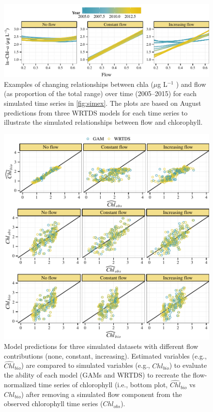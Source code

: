 \documentclass[letterpaper,12pt,oneside]{article}\usepackage[]{graphicx}\usepackage[]{color}
\makeatletter
\def\maxwidth{ %
  \ifdim\Gin@nat@width>\linewidth
    \linewidth
  \else
    \Gin@nat@width
  \fi
}
\newcommand{\mugl}{$\mu$g L$^{-1}$ }
\makeatother
\begin{document}
\begin{figure}[!ht]

{\centering \includegraphics[width=\maxwidth]{figs/dynasim-1} 

}

\caption{Examples of changing relationships between \ac{chla} (\mugl) and flow (as proportion of the total range) over time (2005--2015) for each simulated time series in \cref{fig:simex}.  The plots are based on August predictions from three \ac{WRTDS} models for each time series to illustrate the simulated relationships between flow and chlorophyll.}\label{fig:dynasim}
\end{figure}



\begin{figure}[!ht]

{\centering \includegraphics[width=\maxwidth]{figs/simres-1} 

}

\caption{Model predictions for three simulated datasets with different flow contributions (none, constant, increasing).  Estimated variables (e.g., $\widehat{Chl}_{bio}$) are compared to simulated variables (e.g., $Chl_{bio}$) to evaluate the ability of each model (\acp{GAM} and \ac{WRTDS}) to recreate the flow-normalized time series of chlorophyll (i.e., bottom plot, $\widehat{Chl}_{bio}$ vs $Chl_{bio}$) after removing a simulated flow component from the observed chlorophyll time series ($Chl_{obs}$).}\label{fig:simres}
\end{figure}
\end{document}
